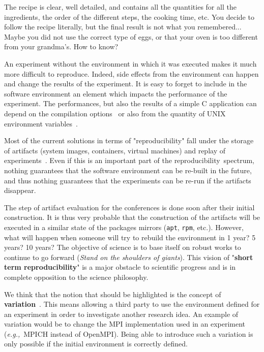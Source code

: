 \documentclass[sigconf,natbib=false]{acmart}
\newcommand{\repro}{reproducibility}
\newcommand{\eg}{\emph{e.g.,}}
\begin{document}
The recipe is clear, well detailed, and contains all the quantities for all the ingredients, the order of the different steps, the cooking time, etc.
You decide to follow the recipe literally, but the final result is not what you remembered...
Maybe you did not use the correct type of eggs, or that your oven is too different from your grandma's.
How to know?


An experiment without the environment in which it was executed makes it much more difficult to reproduce.
Indeed, side effects from the environment can happen and change the results of the experiment.
It is easy to forget to include in the software environment an element which impacts the performance of the experiment.
The performances, but also the results of a simple C application can depend on the compilation options\ \cite{stodden2018assessing} or also from the quantity of UNIX environment variables\ \cite{mytkowicz2009producing}.

Most of the current solutions in terms of "\repro" fall under the storage of artifacts (system images, containers, virtual machines) and replay of experiments\ \cite{rosendo2020e2clab, brammer2011paper, brinckman2019computing}.
Even if this is an important part of the \repro\ spectrum, nothing guarantees that the software environment can be re-built in the future, and thus nothing guarantees that the experiments can be re-run if the artifacts disappear. 


The step of artifact evaluation for the conferences is done soon after their initial construction.
It is thus very probable that the construction of the artifacts will be executed in a similar state of the packages mirrors (\texttt{apt}, \texttt{rpm}, etc.).
However, what will happen when someone will try to rebuild the environment in 1 year? 5 years? 10 years?
The objective of science is to base itself on robust works to continue to go forward (\emph{Stand on the shoulders of giants}).
This vision of "\textbf{short term reproducibility}" is a major obstacle to scientific progress and is in complete opposition to the science philosophy.


We think that the notion that should be highlighted is the concept of \textbf{variation}\ \cite{mercier2018considering, feitelson_repeatability_2015}.
This means allowing a third party to use the environment defined for an experiment in order to investigate another research idea.
An example of variation would be to change the MPI implementation used in an experiment (\eg\ MPICH instead of OpenMPI).
Being able to introduce such a variation is only possible if the initial environment is correctly defined.
\end{document}
